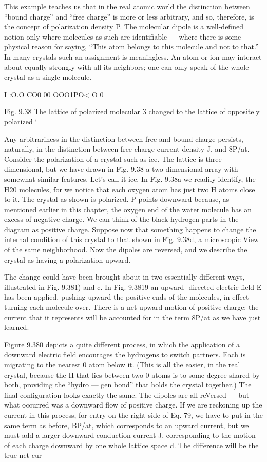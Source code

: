 {This example teaches us that in the real atomic world the distinction
between ``bound charge'' and ``free charge'' is more or less
arbitrary, and so, therefore, is the concept of polarization density P.
The molecular dipole is a well-defined notion only where molecules
as such are identifiable --- where there is some physical reason for
saying, ``This atom belongs to this molecule and not to that.'' In
many crystals such an assignment is meaningless. An atom or ion
may interact about equally strongly with all its neighbors; one can
only speak of the whole crystal as a single molecule.

I :O.O CO0
00 OOO1PO<
O 0

Fig. 9.38 The lattice of polarized molecular 3
changed to the lattice of oppositely polarized ‘

Any arbitrariness in the distinction between free and bound charge
persists, naturally, in the distinction between free charge current
density J, and 8P/at. Consider the polarization of a crystal such as
ice. The lattice is three-dimensional, but we have drawn in Fig. 9.38
a two-dimensional array with somewhat similar features. Let's call
it ice. In Fig. 9.38a we readily identify, the H20 molecules, for we
notice that each oxygen atom has just two H atoms close to it. The
crystal as shown is polarized. P points downward because, as mentioned
earlier in this chapter, the oxygen end of the water molecule
has an excess of negative charge. We can think of the black hydrogen
parts in the diagram as positive charge. Suppose now that something
happens to change the internal condition of this crystal to that
shown in Fig. 9.38d, a microscopic View of the same neighborhood.
Now the dipoles are reversed, and we describe the crystal as having
a polarization upward.

The change could have been brought about in two essentially different
ways, illustrated in Fig. 9.381) and c. In Fig. 9.3819 an upward-
directed electric field E has been applied, pushing upward the positive
ends of the molecules, in effect turning each molecule over.
There is a net upward motion of positive charge; the current that it
represents will be accounted for in the term 8P/at as we have just
learned.

Figure 9.380 depicts a quite different process, in which the application
of a downward electric field encourages the hydrogens to switch
partners. Each is migrating to the nearest 0 atom below it. (This
is all the easier, in the real crystal, because the H that lies between
two 0 atoms is to some degree shared by both, providing the ``hydro --- 
gen bond'' that holds the crystal together.) The final configuration
looks exactly the same. The dipoles are all reVersed --- but what occurred
was a downward flow of positive charge. If we are reckoning
up the current in this process, for entry on the right side of Eq. 79,
we have to put in the same term as before, BP/at, which corresponds
to an upward current, but we must add a larger downward conduction
current J, corresponding to the motion of each charge downward
by one whole lattice space d. The difference will be the true net cur-

}
